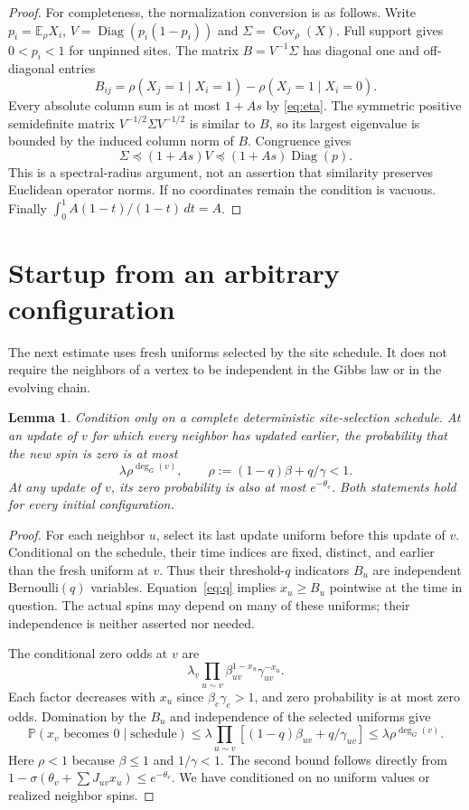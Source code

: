 \documentclass[11pt]{article}
\newtheorem{lemma}[theorem]{Lemma}
\theoremstyle{remark}\newtheorem{remark}[theorem]{Remark}
\newcommand{\Cov}{\operatorname{Cov}}
\newcommand{\diag}{\operatorname{Diag}}
\newcommand{\E}{\mathbb E}
\newcommand{\Prob}{\mathbb P}
\newcommand{\sig}{\sigma}
\begin{document}
\begin{proof}
For completeness, the normalization conversion is as follows.
Write $p_i=\E_\rho X_i$, $V=\diag(p_i(1-p_i))$ and
$\Sigma=\Cov_\rho(X)$. Full support gives $0<p_i<1$ for unpinned sites.
The matrix $B=V^{-1}\Sigma$ has diagonal one and off-diagonal entries
\[
 B_{ij}=\rho(X_j=1\mid X_i=1)-\rho(X_j=1\mid X_i=0).
\]
Every absolute column sum is at most $1+As$ by \eqref{eq:eta}.
The symmetric positive semidefinite matrix $V^{-1/2}\Sigma V^{-1/2}$
is similar to $B$, so its largest eigenvalue is bounded by the induced
column norm of $B$. Congruence gives
\[
 \Sigma\preceq(1+As)V\preceq(1+As)\diag(p).
\]
This is a spectral-radius argument, not an assertion that similarity
preserves Euclidean operator norms. If no coordinates remain the condition
is vacuous. Finally $\int_0^1 A(1-t)/(1-t)\,dt=A$.
\end{proof}

\section{Startup from an arbitrary configuration}

The next estimate uses fresh uniforms selected by the site schedule.
It does not require the neighbors of a vertex to be independent in the
Gibbs law or in the evolving chain.

\begin{lemma}\label{lem:update}
Condition only on a complete deterministic site-selection schedule.
At an update of $v$ for which every neighbor has updated earlier,
the probability that the new spin is zero is at most
\[
 \lambda\rho^{\deg_G(v)},\qquad
 \rho:=(1-q)\beta+q/\gamma<1.
\]
At any update of $v$, its zero probability is also at most $e^{-\theta_v}$.
Both statements hold for every initial configuration.
\end{lemma}
\begin{proof}
For each neighbor $u$, select its last update uniform before this update
of $v$. Conditional on the schedule, their time indices are fixed,
distinct, and earlier than the fresh uniform at $v$. Thus their
threshold-$q$ indicators $B_u$ are independent Bernoulli$(q)$ variables.
Equation~\eqref{eq:q} implies $x_u\geq B_u$ pointwise at the time in
question. The actual spins may depend on many of these uniforms; their
independence is neither asserted nor needed.

The conditional zero odds at $v$ are
\[
 \lambda_v\prod_{u\sim v}\beta_{uv}^{1-x_u}\gamma_{uv}^{-x_u}.
\]
Each factor decreases with $x_u$ since $\beta_e\gamma_e>1$, and zero
probability is at most zero odds. Domination by the $B_u$ and independence
of the selected uniforms give
\[
 \Prob(x_v\text{ becomes }0\mid\text{schedule})
 \leq\lambda\prod_{u\sim v}[(1-q)\beta_{uv}+q/\gamma_{uv}]
 \leq\lambda\rho^{\deg_G(v)}.
\]
Here $\rho<1$ because $\beta\leq1$ and $1/\gamma<1$.
The second bound follows directly from
$1-\sig(\theta_v+\sum J_{uv}x_u)\leq e^{-\theta_v}$.
We have conditioned on no uniform values or realized neighbor spins.
\end{proof}
\end{document}
